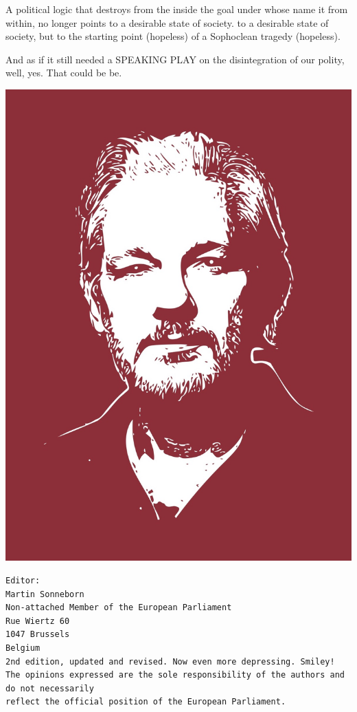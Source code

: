 \begin{multicols}{2}
A political logic that destroys from the inside the goal under whose name it from within, no longer
points to a desirable state of society. to a desirable state of society, but to the starting point
(hopeless) of a Sophoclean tragedy (hopeless).

And as if it still needed a SPEAKING PLAY on the disintegration of our polity, well, yes. That could
be be.




\end{multicols}
\newpage
\pagecolor{assangered}\afterpage{\nopagecolor}
\includegraphics[width=180mm]{assange.jpg}

\newpage
\thispagestyle{empty} %
\vspace*{\fill}
\begin{verbatim}
Editor:
Martin Sonneborn
Non-attached Member of the European Parliament
Rue Wiertz 60
1047 Brussels
Belgium
2nd edition, updated and revised. Now even more depressing. Smiley!
The opinions expressed are the sole responsibility of the authors and do not necessarily 
reflect the official position of the European Parliament.
\end{verbatim}
